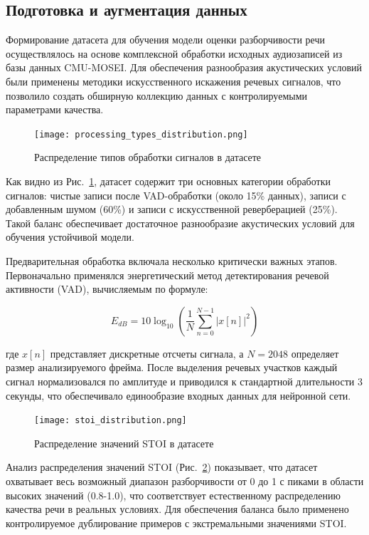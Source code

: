 \documentclass[oneside, final, 14pt]{extarticle}
\begin{document}
\subsection{Подготовка и аугментация данных}

Формирование датасета для обучения модели оценки разборчивости речи осуществлялось на основе комплексной обработки исходных аудиозаписей из базы данных CMU-MOSEI. Для обеспечения разнообразия акустических условий были применены методики искусственного искажения речевых сигналов, что позволило создать обширную коллекцию данных с контролируемыми параметрами качества.

\begin{figure}[]
	\centering
	\texttt{[image: processing\_types\_distribution.png]}
	\caption{Распределение типов обработки сигналов в датасете}
	\label{fig:processing_types}
\end{figure}

Как видно из Рис.~\ref{fig:processing_types}, датасет содержит три основных категории обработки сигналов: чистые записи после VAD-обработки (около 15\% данных), записи с добавленным шумом (60\%) и записи с искусственной реверберацией (25\%). Такой баланс обеспечивает достаточное разнообразие акустических условий для обучения устойчивой модели.

Предварительная обработка включала несколько критически важных этапов. Первоначально применялся энергетический метод детектирования речевой активности (VAD), вычисляемым по формуле:

\begin{equation}
	E_{dB} = 10\log_{10}\left(\frac{1}{N}\sum_{n=0}^{N-1}|x[n]|^2\right)
\end{equation}

где $x[n]$ представляет дискретные отсчеты сигнала, а $N=2048$ определяет размер анализируемого фрейма. После выделения речевых участков каждый сигнал нормализовался по амплитуде и приводился к стандартной длительности 3 секунды, что обеспечивало единообразие входных данных для нейронной сети.

\begin{figure}[h]
	\centering
	\texttt{[image: stoi\_distribution.png]}
	\caption{Распределение значений STOI в датасете}
	\label{fig:stoi_dist}
\end{figure}

Анализ распределения значений STOI (Рис.~\ref{fig:stoi_dist}) показывает, что датасет охватывает весь возможный диапазон разборчивости от 0 до 1 с пиками в области высоких значений (0.8-1.0), что соответствует естественному распределению качества речи в реальных условиях. Для обеспечения баланса было применено контролируемое дублирование примеров с экстремальными значениями STOI.
\end{document}

